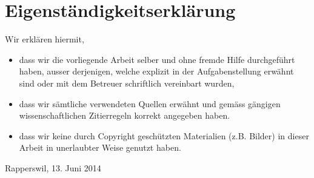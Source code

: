 \section{Eigenständigkeitserklärung}

Wir erklären hiermit, 

\begin{itemize}
	\item	dass wir die vorliegende Arbeit selber und ohne fremde Hilfe
		durchgeführt haben, ausser derjenigen, welche explizit in der
		Aufgabenstellung erwähnt sind oder mit dem Betreuer schriftlich vereinbart
		wurden,
	\item	dass wir sämtliche verwendeten Quellen erwähnt und gemäss gängigen
		wissenschaftlichen Zitierregeln korrekt angegeben haben.
	\item dass wir keine durch Copyright geschützten Materialien (z.B. Bilder) in
		dieser Arbeit in unerlaubter Weise genutzt haben. 
\end{itemize}

\vspace{4mm}

Rapperswil, 13. Juni 2014

\vspace{6mm}

